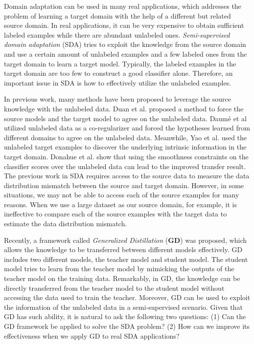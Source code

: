 Domain adaptation can be used in many real applications, which addresses the problem of learning a target domain with the help of a different but related source domain. 
In real applications, it can be very expensive to obtain sufficient labeled examples while there are abundant unlabeled ones. 
\textit{Semi-supervised domain adaptation} (SDA) tries to exploit the knowledge from the source domain and use a certain amount of unlabeled examples and a few labeled ones from the target domain to learn a target model. Typically, the labeled examples in the target domain are too few to construct a good classifier alone. Therefore, an important issue in SDA is how to effectively utilize the unlabeled examples.

In previous work, many methods have been proposed to leverage the source knowledge with the unlabeled data.
Duan et al.\cite{duan2009domain} proposed a method to force the source models and the target model to agree on the unlabeled data. Daum{\'e} et al\cite{daume2010frustratingly} utilized unlabeled data as a co-regularizer and forced the hypotheses learned from different domains to agree on the unlabeled data. Meanwhile, Yao et al.\cite{yao2015semi} used the unlabeled target examples to discover the underlying intrinsic information in the target domain. Donahue et al.\cite{Donahue_2013_CVPR} show that using the smoothness constraints on the classifier scores over the unlabeled data can lead to the improved transfer result.
The previous work in SDA requires access to the source data to measure the data distribution mismatch between the source and target domain.
However, in some situations, we may not be able to access each of the source examples for many reasons. When we use a large dataset as our source domain, for example, it is ineffective to compare each of the source examples with the target data to estimate the data distribution mismatch.

Recently, a framework called \textit{Generalized Distillation} (\textbf{GD})\cite{lopez2015unifying} was proposed, which allows the knowledge to be transferred between different models effectively. GD includes two different models, the teacher model and student model. The student model tries to learn from the teacher model by mimicking the outputs of the teacher model on the training data. Remarkably, in GD, the knowledge can be directly transferred from the teacher model to the student model without accessing the data used to train the teacher. Moreover, GD can be used to exploit the information of the unlabeled data in a semi-supervised scenario\cite{lopez2015unifying}.
Given that GD has such ability, it is natural to ask the following two questions: (1) Can the GD framework be applied to solve the SDA problem? (2) How can we improve its effectiveness when we apply GD to real SDA applications?

